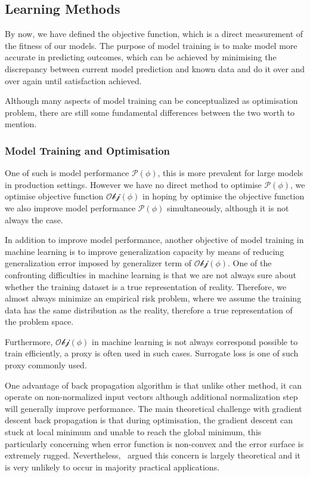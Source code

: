 \subsection {Learning Methods}
By now, we have defined the objective function, which is a direct measurement of the fitness of our models. The purpose of model training is to make model more accurate in predicting outcomes, which can be achieved by minimising the discrepancy between current model prediction and known data and do it over and over again until satisfaction achieved. 
\par 
Although many aspects of model training can be conceptualized as optimisation problem, there are still some fundamental differences between the two worth to mention. 
\par 
\subsubsection{Model Training and Optimisation}
One of such is model performance $\mathcal{P}(\phi)$, this is more prevalent for large models in production settings. However we have no direct method to optimise $\mathcal{P}(\phi)$, we optimise objective function $\mathcal{Obj}(\phi)$ in hoping by optimise the objective function we also improve model performance $\mathcal{P}(\phi)$ simultaneously, although it is not always the case.
\par 
In addition to improve model performance, another objective of model training in machine learning is to improve generalization capacity by means of reducing generalization error imposed by generalizer term of $\mathcal{Obj}(\phi)$. One of the confronting difficulties in machine learning is that we are not always sure about whether the training dataset is a true representation of reality. Therefore, we almost always minimize an empirical risk problem, where we assume the training data has the same distribution as the reality, therefore a true representation of the problem space. 
\par
Furthermore, $\mathcal{Obj}(\phi)$ in machine learning is not always correspond possible to train efficiently, a proxy is often used in such cases. Surrogate loss is one of such proxy commonly used. 

One advantage of back propagation algorithm is that unlike other method, it can operate on non-normalized input vectors although additional normalization step will generally improve performance. \cite{Buckland:2002} The main theoretical challenge with gradient descent back propagation is that during optimisation, the gradient descent can stuck at local minimum and unable to reach the global minimum, this particularly concerning when error function is non-convex and the error surface is extremely rugged. Nevertheless,~\citet{LeCun_2015} argued this concern is largely theoretical and it is very unlikely to occur in majority practical applications. 